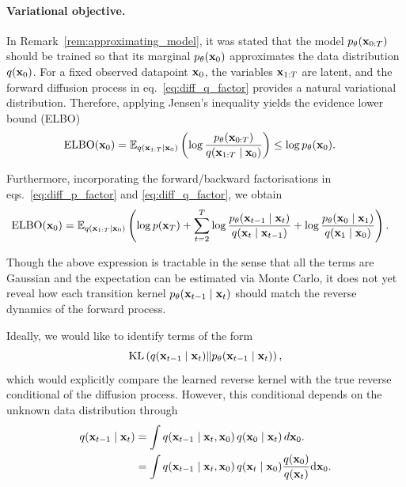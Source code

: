 \paragraph{Variational objective.}

In Remark~\ref{rem:approximating_model}, it was stated that the model $p_\theta({ \mathbf{x}}_{0:T})$ should be trained so that its marginal $p_\theta({ \mathbf{x}}_0)$ approximates the data distribution $q({ \mathbf{x}}_0)$. For a fixed observed datapoint ${ \mathbf{x}}_0$, the variables ${ \mathbf{x}}_{1:T}$ are latent, and the forward diffusion process in eq.~\eqref{eq:diff_q_factor}
provides a natural variational distribution. Therefore, applying
Jensen's inequality yields the evidence lower bound (ELBO)
\begin{align}
{\text{ELBO}}({ \mathbf{x}}_0)
&=
\mathbb{E}_{q({ \mathbf{x}}_{1:T}\mid { \mathbf{x}}_0)}
\left(
\log \frac{p_\theta({ \mathbf{x}}_{0:T})}{q({ \mathbf{x}}_{1:T}\mid { \mathbf{x}}_0)}
\right)
\le \log p_\theta({ \mathbf{x}}_0).
\end{align}

Furthermore, incorporating the forward/backward factorisations in eqs.~\eqref{eq:diff_p_factor} and \eqref{eq:diff_q_factor}, we obtain
\begin{align}
    {\text{ELBO}}({ \mathbf{x}}_0)
    &= \mathbb{E}_{q({ \mathbf{x}}_{1:T} \mid { \mathbf{x}}_0)} \left(\log p({ \mathbf{x}}_T) + \sum_{t=2}^{T}\log\frac{p_\theta ({ \mathbf{x}}_{t-1} \mid { \mathbf{x}}_t)}{ q({ \mathbf{x}}_t \mid { \mathbf{x}}_{t-1})} + \log\frac{p_\theta ({ \mathbf{x}}_{0} \mid { \mathbf{x}}_1)}{ q({ \mathbf{x}}_1 \mid { \mathbf{x}}_{0})} \right).\label{eq:ELBO_DDPM1}
\end{align}


\begin{remark}
Though the above expression is tractable in the sense that all the terms are Gaussian and the expectation can be estimated via Monte Carlo, it does not yet reveal how each transition kernel $p_\theta({ \mathbf{x}}_{t-1}\mid{ \mathbf{x}}_t)$ should match the reverse dynamics of the forward process.

Ideally, we would like to identify terms of the form
\[
\text{KL}\left(q({ \mathbf{x}}_{t-1}\mid{ \mathbf{x}}_t)\middle\|p_\theta({ \mathbf{x}}_{t-1}\mid{ \mathbf{x}}_t)\right),
\]
which would explicitly compare the learned reverse kernel with the true
reverse conditional of the diffusion process. However, this conditional
depends on the unknown data distribution through
\begin{align*}
q({ \mathbf{x}}_{t-1}\mid{ \mathbf{x}}_t)
&=
\int q({ \mathbf{x}}_{t-1}\mid{ \mathbf{x}}_t,{ \mathbf{x}}_0)\,q({ \mathbf{x}}_0\mid{ \mathbf{x}}_t)\,d{ \mathbf{x}}_0.\\
&= \int q({ \mathbf{x}}_{t-1}\mid{ \mathbf{x}}_t,{ \mathbf{x}}_0)\,q({ \mathbf{x}}_{t} \mid { \mathbf{x}}_0) \frac{q({ \mathbf{x}}_0)}{q({ \mathbf{x}}_{t})} {\text{d}}{ \mathbf{x}}_0.
\end{align*}

\end{remark}

